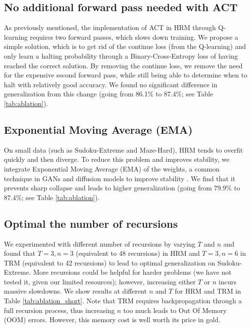 \documentclass{article}
\newcounter{col}
\theoremstyle{plain}
\theoremstyle{definition}
\theoremstyle{remark}
\begin{document}
\subsection{No additional forward pass needed with ACT}

As previously mentioned, the implementation of ACT in HRM through Q-learning requires two forward passes, which slows down training. We propose a simple solution, which is to get rid of the continue loss (from the Q-learning) and only learn a halting probability through a Binary-Cross-Entropy loss of having reached the correct solution. By removing the continue loss, we remove the need for the expensive second forward pass, while still being able to determine when to halt with relatively good accuracy. We found no significant difference in generalization from this change (going from 86.1\% to 87.4\%; see Table \ref{tab:ablation}).

\subsection{Exponential Moving Average (EMA)}

On small data (such as Sudoku-Extreme and Maze-Hard), HRM tends to overfit quickly and then diverge. To reduce this problem and improves stability, we integrate Exponential Moving Average (EMA) of the weights, a common technique in GANs and diffusion models to improve stability \citep{brock2018large, song2020improved}. We find that it prevents sharp collapse and leads to higher generalization (going from 79.9\% to 87.4\%; see Table \ref{tab:ablation}).


\subsection{Optimal the number of recursions}

We experimented with different number of recursions by varying $T$ and $n$ and found that $T=3,n=3$ (equivalent to 48 recursions) in HRM and $T=3,n=6$ in TRM (equivalent to 42 recursions) to lead to optimal generalization on Sudoku-Extreme. More recursions could be helpful for harder problems (we have not tested it, given our limited resources); however, increasing either $T$ or $n$ incurs massive slowdowns. We show results at different $n$ and $T$ for HRM and TRM in Table \ref{tab:ablation_short}. Note that TRM requires backpropagation through a full recursion process, thus increasing $n$ too much leads to Out Of Memory (OOM) errors. However, this memory cost is well worth its price in gold.
\end{document}
